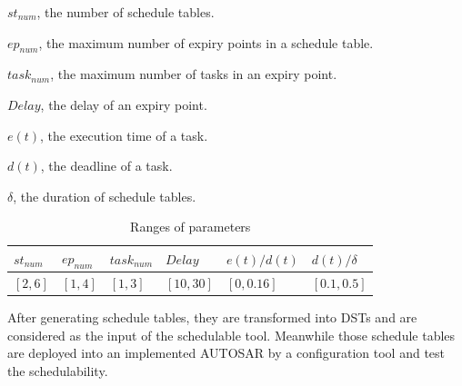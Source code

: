 \documentclass[10pt,conference]{IEEEtran}
\begin{document}
{\begin{compactitem}
  \item $st_{num}$, the number of schedule tables.
  \item $ep_{num}$, the maximum number of expiry points in a schedule table.
  \item $task_{num}$, the maximum number of tasks in an expiry point.
  \item $Delay$, the delay of an expiry point.
  \item $e(t)$, the execution time of a task.
  \item $d(t)$, the deadline of a task.
  \item $\delta$, the duration of schedule tables.
\end{compactitem}
\begin{table}[htbp]
  \centering
  \begin{tabular}{llllll}
    \toprule
    $st_{num}$ & $ep_{num}$ & $task_{num}$ & $Delay$ & $e(t)/d(t)$ & $d(t)/\delta$\\
    \midrule
    $[2,6]$&$[1,4]$&$[1,3]$&$[10,30]$&$[0,0.16]$&$[0.1,0.5]$\\
    \bottomrule
  \end{tabular}
  \caption{Ranges of parameters}\label{range}
\end{table}

After generating schedule tables, they are transformed into DSTs and are considered as the input of the schedulable tool. Meanwhile those schedule tables are deployed into an implemented AUTOSAR by a configuration tool and test the schedulability. 


}
\end{document}
